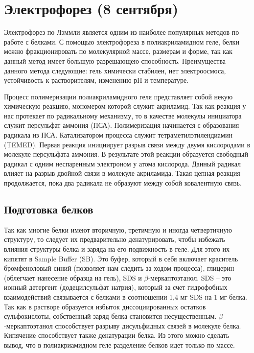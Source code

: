 \section{Электрофорез (8 сентября)}

Электрофорез по Лэммли является одним из наиболее популярных методов по работе с белками. С
помощью электрофореза в полиакриламидном геле, белки можно фракционировать по молекулярной
массе, размерам и форме, так как данный метод имеет большую разрешающею способность. Преимущества
данного метода следующие: гель химически стабилен, нет электроосмоса, устойчивость к
растворителям, изменению рН и температуре.

Процесс полимеризации полиакриламидного геля представляет собой некую химическую реакцию,
мономером которой служит акриламид. Так как реакция у нас протекает по радикальному механизму, то
в качестве молекулы инициатора служит персульфат аммония (ПСА). Полимеризация начинается с
образования радикала из ПСА. Катализатором процесса служит тетраметилэтилендиамин (TEMED). Первая
реакция инициирует разрыв связи между двумя кислородами в молекуле персульфата аммония. В
результате этой реакции образуется свободный радикал с одним неспаренным электроном у атома
кислорода. Данный радикал влияет на разрыв двойной связи в молекуле акриламида. Такая цепная
реакция продолжается, пока два радикала не образуют между собой ковалентную связь.

\subsection{Подготовка белков}

Так как многие белки имеют вторичную, третичную и иногда четвертичную структуру, то следует их
предварительно денатурировать, чтобы избежать влияния структуры белка и заряда на его
подвижность в геле.  Для этого их кипятят в Sample Buffer (SB). Это буфер, который в себя включает краситель
бромфеноловый синий (позволяет нам следить за ходом процесса), глицерин (облегчает нанесение
образца на гель), SDS и $\beta$-меркаптоэтанол. SDS -- это ионный детергент (додецилсульфат натрия), который
за счет гидрофобных взаимодействий связывается с белками в соотношении 1,4 мг SDS на 1 мг белка. Так
как в растворе образуется избыток диссоциированных остатков сульфокислоты, собственный заряд
белка становится несущественным. $\beta$-меркаптоэтанол способствует разрыву дисульфидных связей в
молекуле белка. Кипячение способствует также денатурации белка. Из этого можно сделать вывод, что
в полиакриамидном геле разделение белков идет только по массе.

